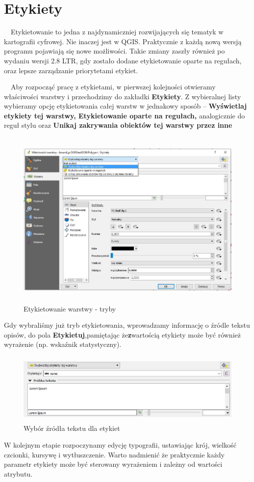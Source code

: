 \documentclass[12pt,a4paper]{book}
\begin{document}
\section{Etykiety}
\ \ Etykietowanie to jedna z najdynamiczniej rozwijających się tematyk w kartografii cyfrowej. Nie inaczej jest w QGIS. Praktycznie z każdą nową wersją programu pojawiają się nowe możliwości. Takie zmiany zaszły również po wydaniu wersji 2.8 LTR, gdy zostało dodane etykietowanie oparte na regułach, oraz lepsze zarządzanie priorytetami etykiet.

\ \ Aby rozpocząć pracę z etykietami, w pierwszej kolejności otwieramy właściwości warstwy i przechodzimy do zakładki \textbf{Etykiety}. Z wybieralnej listy wybieramy opcję etykietowania całej warstw w jednakowy sposób – \textbf{Wyświetlaj etykiety tej warstwy, Etykietowanie oparte na regułach, }analogicznie do reguł stylu oraz\textbf{ Unikaj zakrywania obiektów tej  warstwy przez inne}

\begin{figure}
\includegraphics[width=13cm,height=8.862cm]{007-etykiety-tryb.jpg}
\caption{Etykietowanie warstwy - tryby}
\end{figure}

Gdy wybraliśmy już tryb etykietowania, wprowadzamy informację o źródle tekstu opisów, do pola \textbf{Etykietuj},pamiętając że\textbf{z}wartością etykiety może być również wyrażenie (np. wskaźnik statystyczny).



\begin{center}
\begin{figure}
\includegraphics[width=13cm,height=3.517cm]{007-etykiety-zrodlo.jpg}
\caption{Wybór źródła tekstu dla etykiet}
\end{figure}
\end{center}
W kolejnym etapie rozpoczynamy edycję typografii, ustawiając krój, wielkość czcionki, kursywę i wytłuszczenie. Warto nadmienić że praktycznie każdy parametr etykiety może być sterowany wyrażeniem i zależny od wartości atrybutu.
\end{document}
